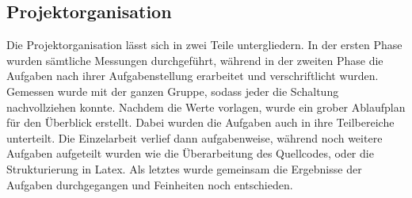 \subsection {Projektorganisation} 
	Die Projektorganisation lässt sich in zwei Teile untergliedern. In der ersten Phase wurden sämtliche Messungen durchgeführt, während in der zweiten Phase die Aufgaben nach ihrer Aufgabenstellung erarbeitet und verschriftlicht wurden. Gemessen wurde mit der ganzen Gruppe, sodass jeder die Schaltung nachvollziehen konnte. Nachdem die Werte vorlagen, wurde ein grober Ablaufplan für den Überblick erstellt. Dabei wurden die Aufgaben auch in ihre Teilbereiche unterteilt. Die Einzelarbeit verlief dann aufgabenweise, während noch weitere Aufgaben aufgeteilt wurden wie die Überarbeitung des Quellcodes, oder die Strukturierung in Latex. Als letztes wurde gemeinsam die Ergebnisse der Aufgaben durchgegangen und Feinheiten noch entschieden.